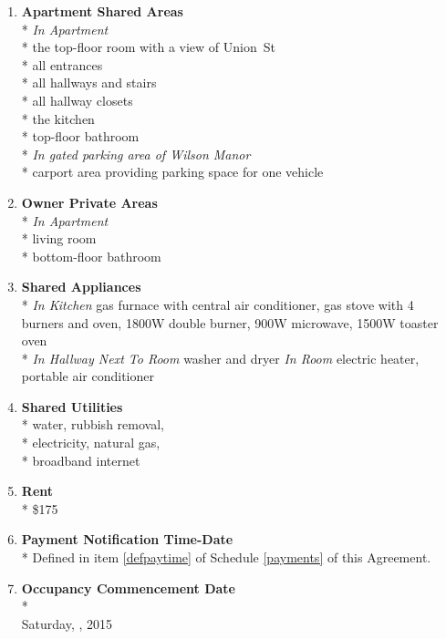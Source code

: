 \documentclass[12pt,letterpaper]{article}
\newcommand{\datefillin}{\hspace{0.2cm}\makebox[3cm]{\hrulefill}}
\newcommand{\condo}{Wilson Manor}
\newcommand{\apt}{Apartment}
\newcommand{\room}{Room}
\newcommand{\shared}{Apartment Shared Areas}
\newcommand{\livingroom}{Owner Private Areas}
\newcommand{\appliances}{Shared Appliances}
\newcommand{\utilities}{Shared Utilities}
\newcommand{\firstday}{Occupancy Commencement Date}
\newcommand{\rent}{\$175}
\newcommand{\paymenttime}{Payment Notification Time-Date}
\begin{document}
\begin{multicols}{2}
\begin{enumerate}
		\item \textbf{\shared{}}\\* \label{shared}
			\textit{In \apt{}}\\*
			the top-floor room with a view of Union~St\\*
			all entrances\\*
			all hallways and stairs\\*
			all hallway closets\\*
			the kitchen\\*
			top-floor bathroom\\*
			\textit{In gated parking area of \condo{}}\\*
			carport area providing parking space for one vehicle
			
		\item \textbf{\livingroom{}}\\* \label{livingroom}
			\textit{In \apt{}}\\*
			living room\\*
			bottom-floor bathroom
			
		\item \textbf{\appliances}\\* \label{appliances}
			\textit{In Kitchen} gas furnace with central air conditioner, 
			gas stove with 4 burners and oven, 
			1800W double burner,
			900W microwave,
			1500W toaster oven\\*
			\textit{In Hallway Next To \room{}} washer and dryer
			\textit{In \room{}} electric heater,
			portable air conditioner
			
		\item \textbf{\utilities{}}\\* \label{utilities}
			water,
			rubbish removal,\\*
			electricity,
			natural gas,\\*
			broadband internet

		\item \textbf{Rent}\\* \label{rent}
			\rent{}

		\item \textbf{\paymenttime{}}\\* \label{paymenttime}
			Defined in item \ref{defpaytime} of Schedule \ref{payments} of this Agreement.

		\item \textbf{\firstday{}} \label{firstday} \\* \\
			Saturday, \datefillin, 2015


\end{enumerate}
\end{multicols}
\end{document}
